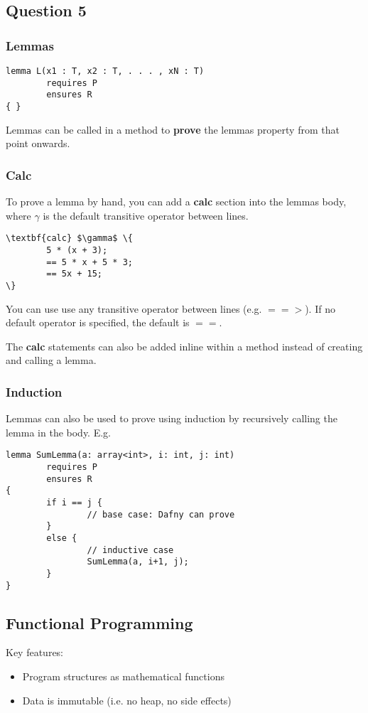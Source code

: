 \subsection{Question 5}

\subsubsection{Lemmas}
\begin{verbatim}
lemma L(x1 : T, x2 : T, . . . , xN : T)
        requires P
        ensures R
{ }
\end{verbatim}

Lemmas can be called in a method to \textbf{prove} the lemmas property from that point onwards.

\subsubsection{Calc}
To prove a lemma by hand, you can add a \textbf{calc} section into the lemmas body, where \textit{$\gamma$} is the default transitive operator between lines.
\begin{Verbatim}[commandchars=\\\{\}, codes={\catcode`$=3\catcode`^=7}]
\textbf{calc} $\gamma$ \{
        5 * (x + 3);
        == 5 * x + 5 * 3;
        == 5x + 15;
\}
\end{Verbatim}

You can use use any transitive operator between lines (e.g. $==>$). If no default operator is specified, the default is $==$.

The \textbf{calc} statements can also be added inline within a method instead of creating and calling a lemma.

\subsubsection{Induction}
Lemmas can also be used to prove using induction by recursively calling the lemma in the body. E.g. \\
\begin{Verbatim}
lemma SumLemma(a: array<int>, i: int, j: int)
        requires P
        ensures R
{
        if i == j {
                // base case: Dafny can prove
        }
        else { 
                // inductive case
                SumLemma(a, i+1, j); 
        }
} 
\end{Verbatim}

\subsection{Functional Programming}
Key features:
\begin{itemize}
        \item Program structures as mathematical functions
        \item Data is immutable (i.e. no heap, no side effects)
\end{itemize}

